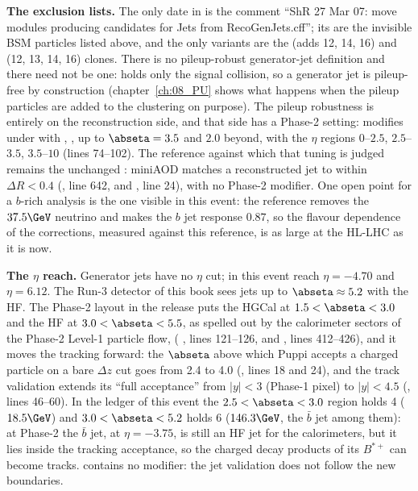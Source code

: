 \textbf{The exclusion lists.} The only date in  is the
comment ``ShR 27 Mar 07: move modules producing candidates for Jets from RecoGenJets.cff''; its
 are the invisible BSM particles listed above, and the only variants are the 
(adds 12, 14, 16) and  (12, 13, 14, 16) clones. There is no pileup-robust generator-jet definition
and there need not be one:  holds only the signal collision, so a generator jet is pileup-free by
construction (chapter~\ref{ch:08_PU} shows what happens when the pileup particles are added to the clustering on
purpose). The pileup robustness is entirely on the reconstruction side, and that side has a Phase-2 setting:
 modifies  under  with
, ,  up to $\abseta=3.5$ and $2.0$
beyond, with the $\eta$ regions $0$--$2.5$, $2.5$--$3.5$, $3.5$--$10$ (lines 74--102). The reference against which
that tuning is judged remains the unchanged : miniAOD matches a reconstructed jet to
 within $\Delta R<0.4$ (, line
642, and , line 24), with no Phase-2 modifier. One open point for a $b$-rich
analysis is the one visible in this event: the  reference removes the $37.5\GeV$ neutrino and makes the
$b$ jet response $0.87$, so the flavour dependence of the corrections, measured against this reference, is as large
at the HL-LHC as it is now.

\textbf{The $\eta$ reach.} Generator jets have no $\eta$ cut; in this event  reach $\eta=-4.70$ and
 $\eta=6.12$. The Run-3 detector of this book sees jets up to $\abseta\approx5.2$ with the HF. The
Phase-2 layout in the release puts the HGCal at $1.5<\abseta<3.0$ and the HF at $3.0<\abseta<5.5$, as spelled out by
the calorimeter sectors of the Phase-2 Level-1 particle flow,
 ( , lines
121--126, and , lines 412--426), and it moves the tracking forward: the $\abseta$ above which Puppi
accepts a charged particle on a bare $\Delta z$ cut goes from 2.4 to 4.0
(, lines 18 and 24), and the track validation extends its
``full acceptance'' from $|y|<3$ (Phase-1 pixel) to $|y|<4.5$
(, lines 46--60). In the ledger of
this event the $2.5<\abseta<3.0$ region holds 4  ($18.5\GeV$) and $3.0<\abseta<5.2$ holds 6
($146.3\GeV$, the $\bar b$ jet among them): at Phase-2 the $\bar b$ jet, at $\eta=-3.75$, is still an HF jet for the
calorimeters, but it lies inside the tracking acceptance, so the charged decay products of its $B^{*+}$ can become
tracks.  contains no  modifier: the jet validation does not follow the
new boundaries.

